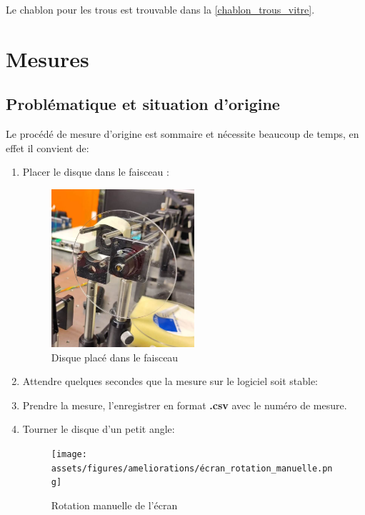 Le chablon pour les trous est trouvable dans la \autoref{chablon_trous_vitre}.
\newpage
\section{Mesures}
\subsection{Problématique et situation d'origine}
Le procédé de mesure d'origine est sommaire et nécessite beaucoup de temps, en effet il convient de:
\begin{enumerate}
    \item Placer le disque dans le faisceau :
          \begin{figure}[H]
              \centering
              \includegraphics[width=0.5\textwidth]{assets/figures/ameliorations/disque_fixe.jpeg}
              \caption{Disque placé dans le faisceau}\label{fig:disque_fixe}
          \end{figure}

    \item Attendre quelques secondes que la mesure sur le logiciel soit stable:

    \item Prendre la mesure, l'enregistrer en format \textbf{.csv} avec le numéro de mesure.

    \item Tourner le disque d'un petit angle:
          \begin{figure}[H]
              \centering
              \texttt{[image: assets/figures/ameliorations/écran\_rotation\_manuelle.png]}
              \caption{Rotation manuelle de l'écran}\label{fig:rotation_manuelle}
          \end{figure}
\end{enumerate}

